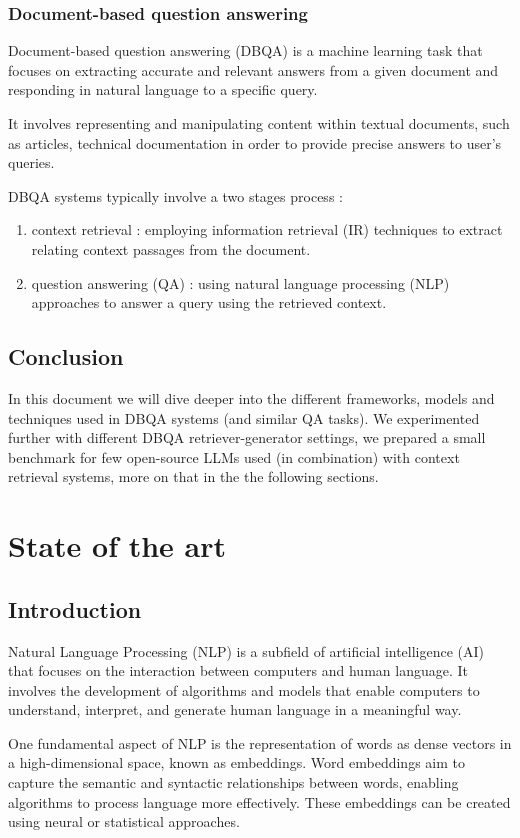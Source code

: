\documentclass[a4paper,12pt]{article}
\begin{document}
\subsubsection{Document-based question answering}
Document-based question answering (DBQA) is a machine learning task that focuses on extracting accurate and relevant answers from a given document and responding in natural language to a specific query. 

It involves representing and manipulating content within textual documents, such as articles, technical documentation in order to provide precise answers to user's queries.

DBQA systems typically involve a two stages process : 
\begin{enumerate}
	\item context retrieval : employing information retrieval (IR) techniques to extract relating context passages from the document.
	\item question answering (QA) : using natural language processing (NLP) approaches to answer a query using the retrieved context.  
\end{enumerate}  

\subsection{Conclusion}
In this document we will dive deeper into the different frameworks, models and techniques used in DBQA systems (and similar QA tasks). 
We experimented further with different DBQA retriever-generator settings, we prepared a small benchmark for few open-source LLMs used (in combination) 
with context retrieval systems, more on that in the the following sections. 

\clearpage
\section{State of the art}

\subsection{Introduction}
Natural Language Processing (NLP) is a subfield of artificial intelligence (AI) that focuses on the interaction between computers and human language. 
It involves the development of algorithms and models that enable computers to understand, interpret, and generate human language in a meaningful way.

One fundamental aspect of NLP is the representation of words as dense vectors in a high-dimensional space, known as embeddings. 
Word embeddings aim to capture the semantic and syntactic relationships between words, enabling algorithms to process language more effectively. 
These embeddings can be created using neural or statistical approaches.
\end{document}
